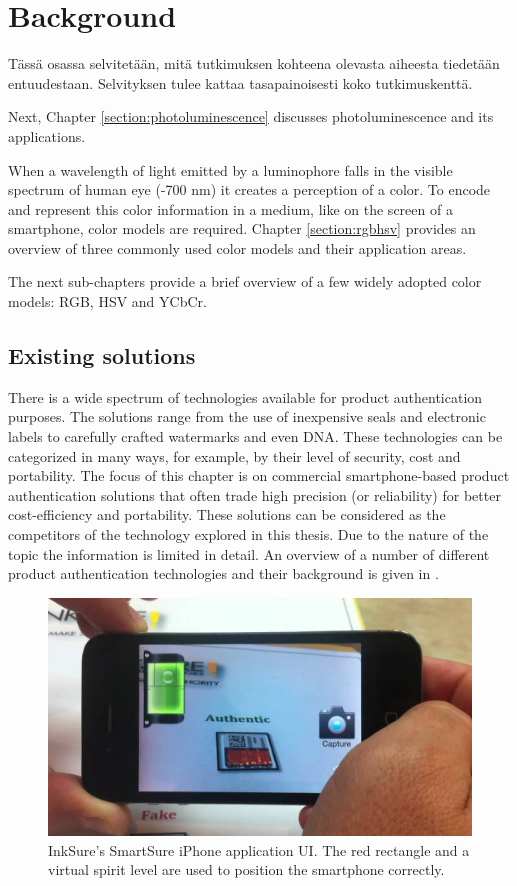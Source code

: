\documentclass[thesis.tex]{subfiles}
\begin{document}
\chapter{Background}
\label{chapter:background}

Tässä osassa selvitetään, mitä tutkimuksen kohteena olevasta aiheesta tiedetään entuudestaan. Selvityksen tulee kattaa tasapainoisesti koko tutkimuskenttä.

Next, Chapter \ref{section:photoluminescence} discusses photoluminescence and its applications.

When a wavelength of light emitted by a luminophore falls in the visible spectrum of human eye (-700 nm) it creates a perception of a color. To encode and represent this color information in a medium, like on the screen of a smartphone, color models are required. Chapter \ref{section:rgbhsv} provides an overview of three commonly used color models and their application areas.

The next sub-chapters provide a brief overview of a few widely adopted color models: RGB, HSV and YCbCr.

\section{Existing solutions}

There is a wide spectrum of technologies available for product authentication purposes. The solutions range from the use of inexpensive seals and electronic labels to carefully crafted watermarks and even DNA. These technologies can be categorized in many ways, for example, by their level of security, cost and portability. The focus of this chapter is on commercial smartphone-based product authentication solutions that often trade high precision (or reliability) for better cost-efficiency and portability. These solutions can be considered as the competitors of the technology explored in this thesis. Due to the nature of the topic the information is limited in detail. An overview of a number of different product authentication technologies and their background is given in \cite{kuosmanen}.

\begin{figure}[ht]
\centering \includegraphics[width=13.25cm]{images/existing_solutions/smartsure}
\caption{InkSure's SmartSure iPhone application UI. The red rectangle and a virtual spirit level are used to position the smartphone correctly. \cite{inksure} \label{figure:inksure}}
\end{figure}
\end{document}

